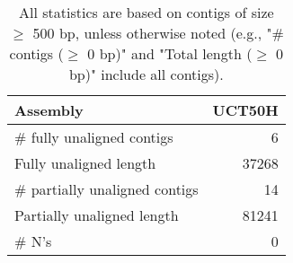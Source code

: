 \documentclass[12pt,a4paper]{article}
\begin{document}
\begin{table}[ht]
\begin{center}
\caption{All statistics are based on contigs of size $\geq$ 500 bp, unless otherwise noted (e.g., "\# contigs ($\geq$ 0 bp)" and "Total length ($\geq$ 0 bp)" include all contigs).}
\begin{tabular}{|l*{1}{|r}|}
\hline
Assembly & UCT50H \\ \hline
\# fully unaligned contigs & 6 \\ \hline
Fully unaligned length & 37268 \\ \hline
\# partially unaligned contigs & 14 \\ \hline
Partially unaligned length & 81241 \\ \hline
\# N's & 0 \\ \hline
\end{tabular}
\end{center}
\end{table}
\end{document}

